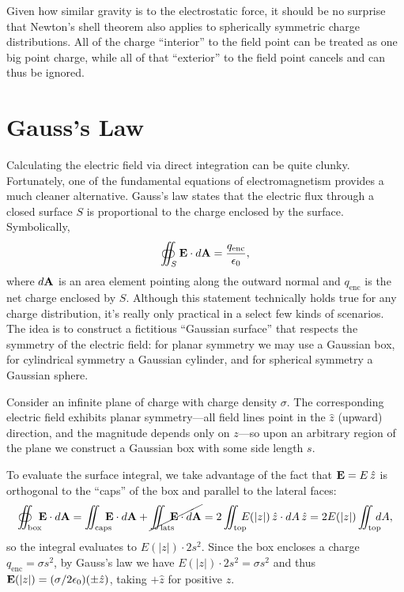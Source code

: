 \documentclass[../p051main.tex]{subfiles}
\begin{document}
Given how similar gravity is to the electrostatic force, it should be no surprise that Newton's shell theorem also applies to spherically symmetric charge distributions.
All of the charge ``interior'' to the field point can be treated as one big point charge, while all of that ``exterior'' to the field point cancels and can thus be ignored.

\section{Gauss's Law}
Calculating the electric field via direct integration can be quite clunky.
Fortunately, one of the fundamental equations of electromagnetism provides a much cleaner alternative.
Gauss's law states that the electric flux through a closed surface $S$ is proportional to the charge enclosed by the surface.
Symbolically,
\[ \oiint_S \mathbf{E} \cdot d\mathbf{A} = \frac{q_\textrm{enc}}{\epsilon_0}, \]
where $d\mathbf{A}$ is an area element pointing along the outward normal and $q_\textrm{enc}$ is the net charge enclosed by $S$.
Although this statement technically holds true for any charge distribution, it's really only practical in a select few kinds of scenarios.
The idea is to construct a fictitious ``Gaussian surface'' that respects the symmetry of the electric field: for planar symmetry we may use a Gaussian box, for cylindrical symmetry a Gaussian cylinder, and for spherical symmetry a Gaussian sphere.

\begin{example}
    Consider an infinite plane of charge with charge density $\sigma$.
    The corresponding electric field exhibits planar symmetry---all field lines point in the $\hat z$ (upward) direction, and the magnitude depends only on $z$---so upon an arbitrary region of the plane we construct a Gaussian box with some side length $s$.

    To evaluate the surface integral, we take advantage of the fact that $\mathbf{E} = E \,\hat z$ is orthogonal to the ``caps'' of the box and parallel to the lateral faces:
    \[ \oiint_\textrm{box} \hspace{-5pt} \mbf{E} \cdot d\mbf{A} = \iint_\textrm{caps} \hspace{-8pt} \mbf{E} \cdot d\mbf{A} + \cancel{\iint_\textrm{lats} \hspace{-6pt} \mbf{E} \cdot d\mbf{A}} = 2\iint_\textrm{top} \hspace{-7pt} E(|z|) \,\hat z \cdot dA \,\hat z = 2 E(|z|) \iint_\textrm{top} \hspace{-7pt} dA, \]
    so the integral evaluates to $E(|z|) \cdot 2s^2$. Since the box encloses a charge $q_\textrm{enc} = \sigma s^2$, by Gauss's law we have $E(|z|) \cdot 2s^2 = \sigma s^2$ and thus $\mathbf{E}(|z|) = (\sigma / 2\epsilon_0) (\pm \hat z)$, taking $+\hat z$ for positive $z$.
\end{example}
\end{document}
